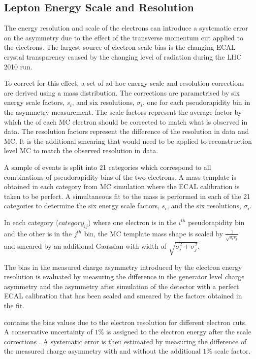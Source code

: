 \subsection{Lepton Energy Scale and Resolution}
\label{sec:adhoc}

The energy resolution and scale of the electrons can introduce a systematic
error on the asymmetry due to the effect of the transverse momentum cut
applied to the electrons. The largest source of electron scale bias is the
changing ECAL crystal transparency caused by the changing level of radiation
during the {LHC} 2010 run.

To correct for this effect, a set of ad-hoc energy scale and resolution corrections are
derived using a \Zee mass distribution. The corrections are parametrised by
six energy scale factors, $s_i$, and six resolutions, $\sigma_i$, one for each
pseudorapidity bin in the asymmetry measurement.
The scale factors represent the average factor by which the \pT of each {MC} electron
should be corrected to match what is observed in data.
The resolution factors represent the difference of the resolution in data and
{MC}. It is the additional smearing that would need to be applied to
reconstruction level {MC} to match the observed resolution in data.

A sample of \Zee events is  split into 21 categories which correspond to all
combinations of pseudorapidity bins of the two electrons.  A mass template is
obtained in each category from {MC} simulation where the {ECAL} calibration is
taken to be perfect.
A simultaneous fit to the \Zee mass is performed in each of the 21 categories
to determine the six energy scale factors, $s_i$, and the six resolutions, 
$\sigma_i$.

In each category ($category_{ij}$) where one electron is in the $i^{th}$
pseudorapidity bin and the other is in the $j^{th}$ bin, the {MC} template
mass shape is scaled by $\frac{1}{\sqrt{s_i s_j} } $
and smeared by an additional Gaussian with width of
$\sqrt{\sigma_i^2+\sigma_j^2}$.

The bias in the measured charge asymmetry introduced by the
electron energy resolution is evaluated by measuring the difference in the
generator level charge asymmetry and the asymmetry after simulation of the
detector with a perfect ECAL calibration that has been scaled and smeared by the
factors obtained in the fit.

 contains the bias values due to the electron resolution for
different electron \PT cuts. 
A conservative uncertainty of $1\%$ is assigned to the electron energy after the
scale corrections \cite{baisini2010electron}.  A systematic error is then
estimated by measuring the difference of the measured charge asymmetry with and
without the additional $1\%$ scale factor.

